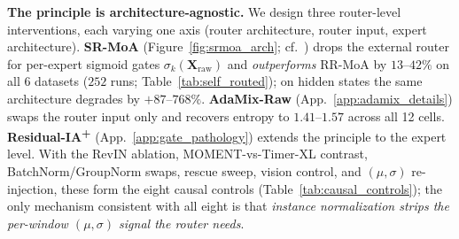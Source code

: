 \documentclass{article}
\begin{document}
\textbf{The principle is architecture-agnostic.} We design three router-level interventions, each varying one axis (router architecture, router input, expert architecture). \textbf{SR-MoA} (Figure~\ref{fig:srmoa_arch}; cf.~\citealp{lv2025aoe,liu2026routingfree,cheng2025ermoe}) drops the external router for per-expert sigmoid gates $\sigma_k(\mathbf{X}_\mathrm{raw})$ and \emph{outperforms} RR-MoA by $13$--$42\%$ on all 6 datasets ($252$ runs; Table~\ref{tab:self_routed}); on hidden states the same architecture degrades by $+87$--$768\%$. \textbf{AdaMix-Raw} (App.~\ref{app:adamix_details}) swaps the router input only and recovers entropy to $1.41$--$1.57$ across all 12 cells. \textbf{Residual-IA\textsuperscript{+}} (App.~\ref{app:gate_pathology}) extends the principle to the expert level. With the RevIN ablation, MOMENT-vs-Timer-XL contrast, BatchNorm/GroupNorm swaps, rescue sweep, vision control, and $(\mu,\sigma)$ re-injection, these form the eight causal controls (Table~\ref{tab:causal_controls}); the only mechanism consistent with all eight is that \emph{instance normalization strips the per-window $(\mu,\sigma)$ signal the router needs}.
\end{document}
